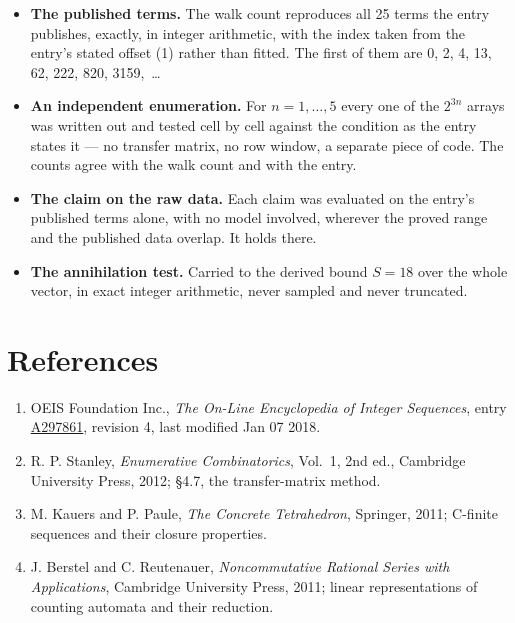 \documentclass[11pt]{article}
\theoremstyle{definition}
\begin{document}
\begin{itemize}

\item {\bfseries The published terms.} The walk count reproduces all 25 terms the entry publishes, exactly, in integer arithmetic, with the index taken from the entry's stated offset (1) rather than fitted. The first of them are 0, 2, 4, 13, 62, 222, 820, 3159,~\dots

\item {\bfseries An independent enumeration.} For $n = 1,\dots,5$ every one of the $2^{3n}$ arrays was written out and tested cell by cell against the condition as the entry states it --- no transfer matrix, no row window, a separate piece of code. The counts agree with the walk count and with the entry.

\item {\bfseries The claim on the raw data.} Each claim was evaluated on the entry's published terms alone, with no model involved, wherever the proved range and the published data overlap. It holds there.

\item {\bfseries The annihilation test.} Carried to the derived bound $S = 18$ over the whole vector, in exact integer arithmetic, never sampled and never truncated.

\end{itemize}

\section{References}

\begin{enumerate}

\item OEIS Foundation Inc., \emph{The On-Line Encyclopedia of Integer Sequences}, entry \href{https://oeis.org/A297861}{A297861}, revision 4, last modified Jan 07 2018.

\item R. P. Stanley, \emph{Enumerative Combinatorics}, Vol.~1, 2nd ed., Cambridge University Press, 2012; \S4.7, the transfer-matrix method.

\item M. Kauers and P. Paule, \emph{The Concrete Tetrahedron}, Springer, 2011; C-finite sequences and their closure properties.

\item J. Berstel and C. Reutenauer, \emph{Noncommutative Rational Series with Applications}, Cambridge University Press, 2011; linear representations of counting automata and their reduction.

\end{enumerate}
\end{document}
